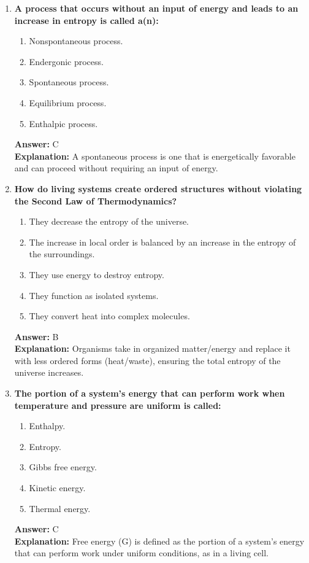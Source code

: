 \documentclass[11pt, a4paper]{article}
\begin{document}
\begin{enumerate}[leftmargin=*, label=\arabic*.]
\item \textbf{A process that occurs without an input of energy and leads to an increase in entropy is called a(n):}
\begin{enumerate}[label=\Alph*.]
    \item Nonspontaneous process.
    \item Endergonic process.
    \item Spontaneous process.
    \item Equilibrium process.
    \item Enthalpic process.
\end{enumerate}
\textbf{Answer:} C \\
\textbf{Explanation:} A spontaneous process is one that is energetically favorable and can proceed without requiring an input of energy.

\item \textbf{How do living systems create ordered structures without violating the Second Law of Thermodynamics?}
\begin{enumerate}[label=\Alph*.]
    \item They decrease the entropy of the universe.
    \item The increase in local order is balanced by an increase in the entropy of the surroundings.
    \item They use energy to destroy entropy.
    \item They function as isolated systems.
    \item They convert heat into complex molecules.
\end{enumerate}
\textbf{Answer:} B \\
\textbf{Explanation:} Organisms take in organized matter/energy and replace it with less ordered forms (heat/waste), ensuring the total entropy of the universe increases.

\item \textbf{The portion of a system's energy that can perform work when temperature and pressure are uniform is called:}
\begin{enumerate}[label=\Alph*.]
    \item Enthalpy.
    \item Entropy.
    \item Gibbs free energy.
    \item Kinetic energy.
    \item Thermal energy.
\end{enumerate}
\textbf{Answer:} C \\
\textbf{Explanation:} Free energy (G) is defined as the portion of a system's energy that can perform work under uniform conditions, as in a living cell.


\end{enumerate}
\end{document}
